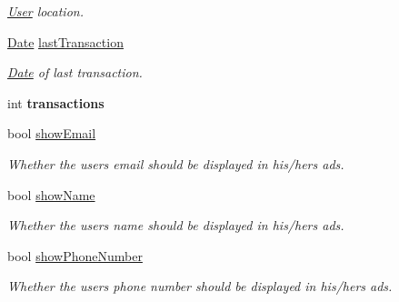 \begin{DoxyCompactItemize}
\begin{DoxyCompactList}\small\item\em \hyperlink{class_user}{User} location. \end{DoxyCompactList}\item 
\hypertarget{class_user_a6ef91bb5650bac3417dd1900ed684d1b}{}\hyperlink{class_date}{Date} \hyperlink{class_user_a6ef91bb5650bac3417dd1900ed684d1b}{last\+Transaction}\label{class_user_a6ef91bb5650bac3417dd1900ed684d1b}

\begin{DoxyCompactList}\small\item\em \hyperlink{class_date}{Date} of last transaction. \end{DoxyCompactList}\item 
\hypertarget{class_user_ac404764d14c90c3148a222c6e61e1f11}{}int {\bfseries transactions}\label{class_user_ac404764d14c90c3148a222c6e61e1f11}

\item 
\hypertarget{class_user_a82dcde625983882667723c4549156db8}{}bool \hyperlink{class_user_a82dcde625983882667723c4549156db8}{show\+Email}\label{class_user_a82dcde625983882667723c4549156db8}

\begin{DoxyCompactList}\small\item\em Whether the user\textquotesingle{}s email should be displayed in his/hers ads. \end{DoxyCompactList}\item 
\hypertarget{class_user_a0360d5ecb5643df7899cef2c1479bd30}{}bool \hyperlink{class_user_a0360d5ecb5643df7899cef2c1479bd30}{show\+Name}\label{class_user_a0360d5ecb5643df7899cef2c1479bd30}

\begin{DoxyCompactList}\small\item\em Whether the user\textquotesingle{}s name should be displayed in his/hers ads. \end{DoxyCompactList}\item 
\hypertarget{class_user_af166bac19b9b0b9b85d1b51aaff9cbd9}{}bool \hyperlink{class_user_af166bac19b9b0b9b85d1b51aaff9cbd9}{show\+Phone\+Number}\label{class_user_af166bac19b9b0b9b85d1b51aaff9cbd9}

\begin{DoxyCompactList}\small\item\em Whether the user\textquotesingle{}s phone number should be displayed in his/hers ads. \end{DoxyCompactList}\end{DoxyCompactItemize}
